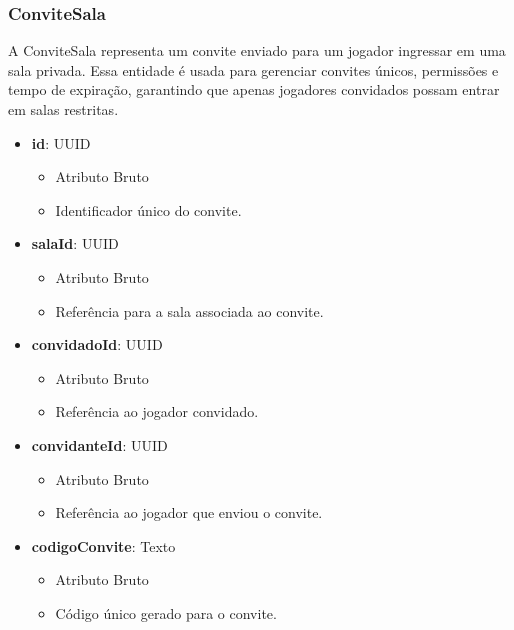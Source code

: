     \subsubsection{ConviteSala}
    A ConviteSala representa um convite enviado para um jogador ingressar em uma sala privada. Essa entidade é usada para gerenciar convites únicos, permissões e tempo de expiração, garantindo que apenas jogadores convidados possam entrar em salas restritas.
    \begin{itemize}
        \item \textbf{id}: UUID  
              \begin{itemize}
                  \item Atributo Bruto
                  \item Identificador único do convite.
              \end{itemize}
    
        \item \textbf{salaId}: UUID  
              \begin{itemize}
                  \item Atributo Bruto
                  \item Referência para a sala associada ao convite.
              \end{itemize}
    
        \item \textbf{convidadoId}: UUID  
              \begin{itemize}
                  \item Atributo Bruto
                  \item Referência ao jogador convidado.
              \end{itemize}
    
        \item \textbf{convidanteId}: UUID  
              \begin{itemize}
                  \item Atributo Bruto
                  \item Referência ao jogador que enviou o convite.
              \end{itemize}
    
        \item \textbf{codigoConvite}: Texto  
              \begin{itemize}
                  \item Atributo Bruto
                  \item Código único gerado para o convite.
              \end{itemize}
    

\end{itemize}
